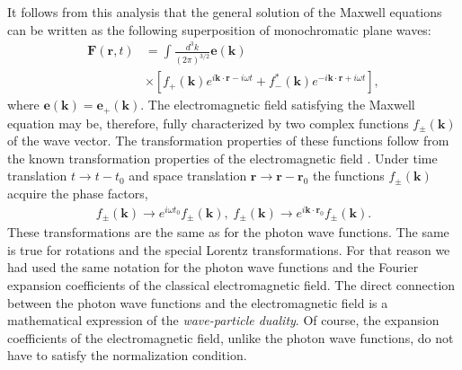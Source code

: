 \documentclass[onecolumn,aps,pra,12pt]{revtex4-1}
\begin{document}
It follows from this analysis that the general solution of the Maxwell equations can be written as the following superposition of monochromatic plane waves:
\begin{align}\label{fin}
{\bm F}(\bm r,t)&=\int\!\frac{d^3k}{(2\pi)^{3/2}}{\bm e}(\bm k)\nonumber\\
&\times\left[f_+(\bm k)e^{i\bm k\cdot\bm r-i\omega t}+f_-^*(\bm k)e^{-i\bm k\cdot\bm r+i\omega t}\right],
\end{align}
where ${\bm e}({\bm k})={\bm e}_+({\bm k})$. The electromagnetic field satisfying the Maxwell equation may be, therefore, fully characterized by two complex functions $f_\pm({\bm k})$ of the wave vector. The transformation properties of these functions follow from the known transformation properties of the electromagnetic field \cite{jack}. Under time translation $t\to t-t_0$ and space translation $\bm r\to \bm r-\bm r_0$ the functions $f_\pm({\bm k})$ acquire the phase factors,
\begin{align}\label{trans}
f_\pm(\bm k)\to e^{i\omega t_0}f_\pm(\bm k),\;f_\pm(\bm k)\to e^{i{\bm k}\cdot{\bm r}_0}f_\pm(\bm k).
\end{align}
These transformations are the same as for the photon wave functions. The same is true for rotations and the special Lorentz transformations. For that reason we had used the same notation for the photon wave functions and the Fourier expansion coefficients of the classical electromagnetic field. The direct connection between the photon wave functions and the electromagnetic field is a mathematical expression of the {\em wave-particle duality}. Of course, the expansion coefficients of the electromagnetic field, unlike the photon wave functions, do not have to satisfy the normalization condition.
\end{document}
